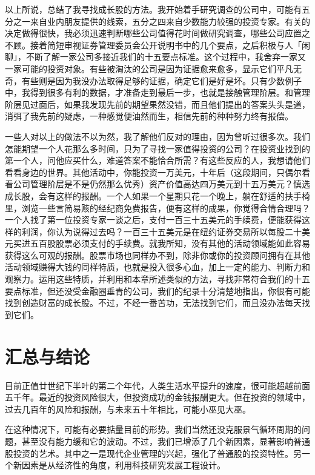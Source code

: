 \documentclass[UTF8,a4paper,zihao=-4,fontset = windows]{ctexart} %
\begin{document}
以上所说，总结了我寻找成长股的方法。我开始着手研究调查的公司中，可能有五分之一来自业内朋友提供的线索，五分之四来自少数能力较强的投资专家。有关的决定做得很快，我必须迅速判断哪些公司值得花时间做研究调查，哪些公司应置之不顾。接着简短审视证券管理委员会公开说明书中的几个要点，之后积极与人「闲聊」，不断了解一家公司多接近我们的十五要点标准。这个过程中，我舍弃一家又一家可能的投资对象。有些被淘汰的公司是因为证据愈来愈多，显示它们平凡无奇，有些则是因为我没办法取得足够的证据，确定它们是好是坏。只有少数例子中，我得到很多有利的数据，才准备走到最后一步，也就是接触管理阶层。和管理阶层见过面后，如果我发现先前的期望果然没错，而且他们提出的答案头头是道，消弭了我先前的疑虑，一种感觉便油然而生，相信先前的种种努力终有报偿。

一些人对以上的做法不以为然，我了解他们反对的理由，因为曾听过很多次。我们怎能期望一个人花那么多时间，只为了寻找一家值得投资的公司？在投资业找到的第一个人，问他应买什么，难道答案不能恰合所需？有这些反应的人，我想请他们看看身边的世界。其他活动中，你能投资一万美元，十年后（这段期间，只偶尔看看公司管理阶层是不是仍然那么优秀）资产价值高达四万美元到十五万美元？慎选成长股，会有这样的报酬。一个人如果一个星期只花一个晚上，躺在舒适的扶手椅里，浏览一些言简易赅的经纪商免费报告，便有这样的成果，你觉得合情合理吗？一个人找了第一位投资专家一谈之后，支付一百三十五美元的手续费，便能获得这样的利润，你认为说得过去吗？一百三十五美元是在纽约证券交易所以每股二十美元买进五百股股票必须支付的手续费。就我所知，没有其他的活动领域能如此容易获得这么可观的报酬。股票市场也同样办不到，除非你或你的投资顾问拥有在其他活动领域赚得大钱的同样特质，也就是投入很多心血，加上一定的能力、判断力和观察力。运用这些特质，并利用和本章所述类似的方法，寻找非常符合我们的十五要点标准，但还没受金融圈垂青的公司，我们的纪录十分清楚地指出，你很有可能找到创造财富的成长股。不过，不经一番苦功，无法找到它们，而且没办法每天找到它们。

\section{汇总与结论}

目前正值廿世纪下半叶的第二个年代，人类生活水平提升的速度，很可能超越前面五千年。最近的投资风险很大，但投资成功的金钱报酬更大。但在投资的领域中，过去几百年的风险和报酬，与未来五十年相比，可能小巫见大巫。

在这种情况下，可能有必要掂量目前的形势。我们当然还没克服景气循环周期的问题，甚至没有能力缓和它的波动。不过，我们已增添了几个新因素，显著影响普通股投资的艺术。其中之一是现代企业管理的兴起，强化了普通股的投资特性。另一个新因素是从经济性的角度，利用科技研究发展工程设计。
\end{document}
